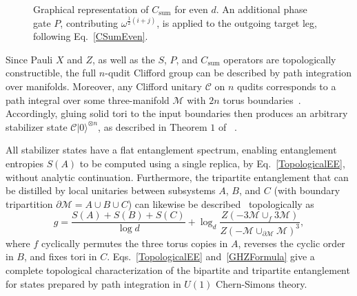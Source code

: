 \documentclass[12pt,a4paper]{article}
\def\ket#1{{|{#1}\rangle}}
\begin{document}
\begin{figure}[h]
\begin{center}
\caption{Graphical representation of $C_{\mathrm{sum}}$ for even $d$. An additional phase gate $P$, contributing $\omega^{\frac{1}{2}(i+j)}$, is applied to the outgoing target leg, following Eq.\ \eqref{CSumEven}.}
\label{CSumPhase}
\end{center}
\end{figure}
%

Since Pauli $X$ and $Z$, as well as the $S$, $P$, and $C_{\mathrm{sum}}$ operators are topologically constructible, the full $n$-qudit Clifford group can be described by path integration over manifolds. Moreover, any Clifford unitary $\mathcal{C}$ on $n$ qudits corresponds to a path integral over some three-manifold $\mathcal{M}$ with $2n$ torus boundaries~\cite{Salton:2016qpp}. Accordingly, gluing solid tori to the input boundaries then produces an arbitrary stabilizer state $\mathcal{C}\ket{0}^{\otimes n}$, as described in Theorem $1$ of ~\cite{Salton:2016qpp}.

All stabilizer states have a flat entanglement spectrum, enabling entanglement entropies $S(A)$ to be computed using a single replica, by Eq.\ \eqref{TopologicalEE}, without analytic continuation. Furthermore, the tripartite entanglement that can be distilled by local unitaries between subsystems $A$, $B$, and $C$ (with boundary tripartition $\partial\mathcal{M} = A \cup B \cup C$) can likewise be described~\cite{Salton:2016qpp,Nezami:2016zni} topologically as
%
\begin{equation}\label{GHZFormula}
g = \frac{S(A) + S(B) + S(C)}{\log d} + \log_d \frac{Z(-3\mathcal{M} \cup_f 3\mathcal{M})}{Z(-\mathcal{M} \cup_{\partial \mathcal{M}} \mathcal{M})^3},
\end{equation}
%
where $f$ cyclically permutes the three torus copies in $A$, reverses the cyclic order in $B$, and fixes tori in $C$. Eqs.\ \eqref{TopologicalEE} and\ \eqref{GHZFormula} give a complete topological characterization of the bipartite and tripartite entanglement for states prepared by path integration in $U(1)$ Chern-Simons theory.
\end{document}
